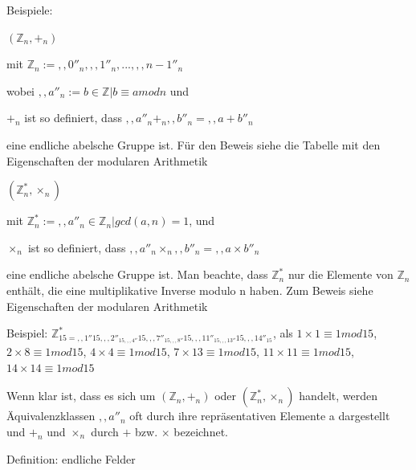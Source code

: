 \documentclass[a4paper]{article}
\begin{document}
\begin{multicols}{3}
\begin{itemize*}
            \item Beispiele:
            \begin{itemize*}
                  \item $(\mathbb{Z}_n , +_n)$
                  \begin{itemize*}
                        \item mit $\mathbb{Z}_n:={,,0''_n,,,1''_n,...,,,n-1''_n}$
                        \item wobei $,,a''_n:={b \in \mathbb{Z} | b \equiv a mod n}$ und
                        \item $+_n$ ist so definiert, dass $,,a''_n+_n,,b''_n=,,a+b''_n$
                        \item eine endliche abelsche Gruppe ist. Für den Beweis siehe die Tabelle mit den Eigenschaften der modularen Arithmetik
                  \end{itemize*}
                  \item $(\mathbb{Z}^*_n , \times_n)$
                  \begin{itemize*}
                        \item mit $\mathbb{Z}^*_n :={,,a''_n\in \mathbb{Z}_n | gcd(a,n)=1}$, und
                        \item $\times_n$ ist so definiert, dass $,,a''_n\times_n ,,b''_n=,,a\times b''_n$
                        \item eine endliche abelsche Gruppe ist. Man beachte, dass $\mathbb{Z}^*_n$ nur die Elemente von $\mathbb{Z}_n$ enthält, die eine multiplikative Inverse modulo n haben. Zum Beweis siehe Eigenschaften der modularen Arithmetik
                        \item Beispiel: $\mathbb{Z}^*_{{15}={,,1''}{15},,,2''_{{15},,,4''}{15},,,7''_{{15},,,8''}{15},,,11''_{{15},,,13''}{15},,,14''_{15}}$, als $1\times 1\equiv 1 mod 15$, $2 \times 8 \equiv 1 mod 15$, $4 \times 4 \equiv 1 mod 15$, $7 \times 13 \equiv 1 mod 15$, $11 \times 11 \equiv 1 mod 15$, $14 \times 14 \equiv 1 mod 15$ \end{itemize*}
            \end{itemize*}
            \item Wenn klar ist, dass es sich um $(\mathbb{Z}_n, +_n)$ oder $(\mathbb{Z}^*_n,\times_n)$ handelt, werden Äquivalenzklassen $,,a''_n$ oft durch ihre repräsentativen Elemente a dargestellt und $+_n$ und $\times_n$ durch $+$ bzw. $\times$ bezeichnet.
            \begin{itemize*}
                  \item Definition: endliche Felder

\end{itemize*}
\end{itemize*}
\end{multicols}
\end{document}
